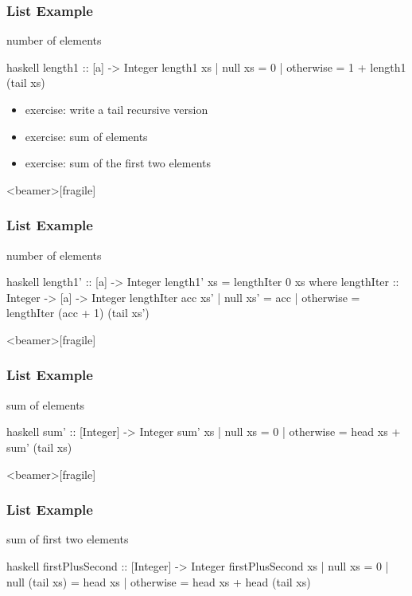 \documentclass[dvipsnames]{beamer}
\theoremstyle{plain}
\begin{document}
\begin{frame}[fragile]
  \frametitle{List Example}

  \begin{exampleblock}{number of elements}
    \begin{pygments}{haskell}
length1 :: [a] -> Integer
length1 xs
  | null xs   = 0
  | otherwise = 1 + length1 (tail xs)
    \end{pygments}
  \end{exampleblock}

  \pause
  \begin{itemize}
    \item exercise: write a tail recursive version
    \item exercise: sum of elements
    \item exercise: sum of the first two elements
  \end{itemize}
\end{frame}

\begin{frame}<beamer>[fragile]
  \frametitle{List Example}

  \begin{exampleblock}{number of elements}
    \begin{pygments}{haskell}
length1' :: [a] -> Integer
length1' xs = lengthIter 0 xs
  where
    lengthIter :: Integer -> [a] -> Integer
    lengthIter acc xs'
      | null xs'  = acc
      | otherwise = lengthIter (acc + 1) (tail xs')
    \end{pygments}
  \end{exampleblock}
\end{frame}

\begin{frame}<beamer>[fragile]
  \frametitle{List Example}

  \begin{exampleblock}{sum of elements}
    \begin{pygments}{haskell}
sum' :: [Integer] -> Integer
sum' xs
  | null xs   = 0
  | otherwise = head xs + sum' (tail xs)
    \end{pygments}
  \end{exampleblock}
\end{frame}

\begin{frame}<beamer>[fragile]
  \frametitle{List Example}

  \begin{exampleblock}{sum of first two elements}
    \begin{pygments}{haskell}
firstPlusSecond :: [Integer] -> Integer
firstPlusSecond xs
  | null xs        = 0
  | null (tail xs) = head xs
  | otherwise      = head xs + head (tail xs)
    \end{pygments}
  \end{exampleblock}
\end{frame}
\end{document}
